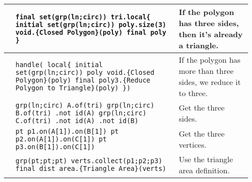 \documentclass[11pt]{report}
\begin{document}
\noindent \begin{tabularx}{\textwidth}{l X p{4cm}}
\hspace{3.5cm} & {\tt final set(grp(ln;circ)) tri.local\{ \newline
  initial set(grp(ln;circ)) poly.size(3) \newline
  void.\{Closed Polygon\}(poly) \newline
  final poly \newline
\}} & {\small If the polygon has three sides, then it's already a triangle. } \\
\hline
 & {\tt handle( local\{ \newline
  initial set(grp(ln;circ)) poly \newline
  void.\{Closed Polygon\}(poly) \newline
  final poly3.\{Reduce Polygon to \newline Triangle\}(poly) \newline
\})} & {\small If the polygon has more than three sides, we reduce it to three. } \\
\hline
 & {\tt grp(ln;circ) A.of(tri) \newline
        grp(ln;circ) B.of(tri) \newline
        .not id(A) \newline
        grp(ln;circ) C.of(tri) \newline
        .not id(A) \newline
        .not id(B) } & {\small Get the three sides. } \\
\hline
\vspace{1.5cm} & {\tt pt p1.on(A[1]).on(B[1]) \newline
        pt p2.on(A[1]).on(C[1]) \newline
        pt p3.on(B[1]).on(C[1])} & {\small Get the three vertices. } \\
\hline
\vspace{1.5cm} & {\tt grp(pt;pt;pt) verts.collect(p1;p2;p3) \newline
        final dist area.\{Triangle Area\}(verts)} & {\small Use the triangle area definition. } \\
\end{tabularx}\\\\



\end{document}

